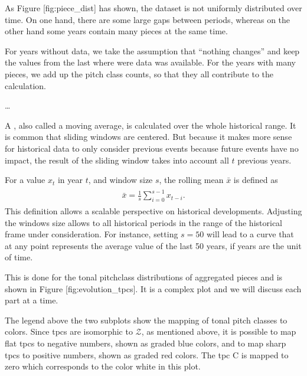 \documentclass[letterpaper,10pt,english]{sphinxmanual}
\begin{document}
\sphinxAtStartPar
As Figure {[}fig:piece\_dist{]} has shown, the dataset is not uniformly
distributed over time. On one hand, there are some large gaps between
periods, whereas on the other hand some years contain many pieces at the
same time.

\sphinxAtStartPar
For years without data, we take the assumption that “nothing changes”
and keep the values from the last where were data was available. For the
years with many pieces, we add up the pitch class counts, so that they
all contribute to the calculation.

\begin{DUlineblock}{0em}
\item[] 
\item[] …
\item[] A , also called a moving average, is calculated over
the whole historical range. It is common that sliding windows are
centered. But because it makes more sense for historical data to only
consider previous events because future events have no impact, the
result of the sliding window takes into account all \(t\) previous
years.
\end{DUlineblock}

\sphinxAtStartPar
For a value \(x_t\) in year \(t\), and window size \(s\),
the rolling mean \(\bar x\) is defined as
\begin{equation*}
\begin{split}\begin{aligned}
    \bar x = \frac{1}{s}\sum_{i=0}^{s-1} x_{t-i}.\end{aligned}\end{split}
\end{equation*}
\sphinxAtStartPar
This definition allows a scalable perspective on historical
developments. Adjusting the windows size allows to all historical
periods in the range of the historical frame under consideration. For
instance, setting \(s=50\) will lead to a curve that at any point
represents the average value of the last 50 years, if years are the unit
of time.

\sphinxAtStartPar
This is done for the tonal pitch\sphinxhyphen{}class distributions of aggregated
pieces and is shown in Figure {[}fig:evolution\_tpcs{]}. It is a complex
plot and we will discuss each part at a time.

\sphinxAtStartPar
The legend above the two subplots show the mapping of tonal pitch
classes to colors. Since tpcs are isomorphic to \(\mathcal Z\), as
mentioned above, it is possible to map flat tpcs to negative numbers,
shown as graded blue colors, and to map sharp tpcs to positive numbers,
shown as graded red colors. The tpc C is mapped to zero which
corresponds to the color white in this plot.
\end{document}
